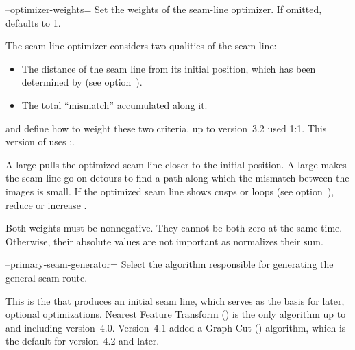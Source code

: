 \begin{codelist}
  \label{opt:optimizer-weights}%
\item[--optimizer-weights=\metavar{DISTANCE-WEIGHT}\optional{:\metavar{MISMATCH-WEIGHT}}]\itemend
  Set the weights of the seam-line optimizer.  If omitted,  defaults to
  1.

  The seam-line optimizer considers two qualities of the seam line:

  \begin{itemize}
  \item
    The distance of the seam line from its initial position, which has been determined by
     (see option~).

  \item
    The total ``mismatch'' accumulated along it.
  \end{itemize}

   and  define how to weight these two
  criteria.  \App{} up to version~3.2 used 1:1.  This version of \App{} uses
  :.

  A large  pulls the optimized seam line closer to the initial
  position.  A large  makes the seam line go on detours to find a
  path along which the mismatch between the images is small.  If the optimized seam line shows
  cusps or loops (see option~), reduce
   or increase .

  Both weights must be nonnegative.  They cannot be both zero at the same time.  Otherwise,
  their absolute values are not important as \App{} normalizes their sum.


  \label{opt:primary-seam-generator}%
\item[--primary-seam-generator=\metavar{ALGORITHM}]\itemend
  Select the algorithm responsible for generating the general seam route.

  This is the  that produces an initial seam line, which serves as the basis
  for later, optional optimizations.  Nearest Feature Transform () is the only
  algorithm up to and including \App{} version~4.0.  Version~4.1 added a Graph-Cut
  () algorithm, which is the default for version~4.2 and later.


\end{codelist}
